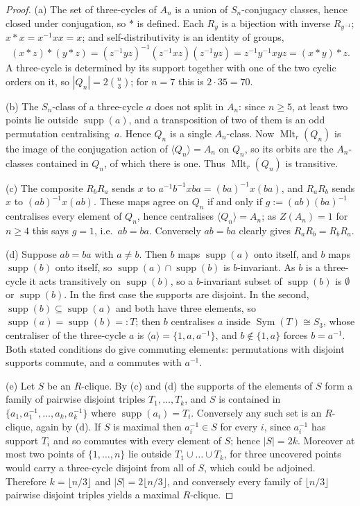 \documentclass[11pt]{amsart}
\theoremstyle{definition}
\theoremstyle{remark}
\DeclareMathOperator{\Mlt}{Mlt}
\DeclareMathOperator{\supp}{supp}
\newcommand{\Rt}{R}
\begin{document}
\begin{proof}
(a) The set of three-cycles of $A_n$ is a union of $S_n$-conjugacy classes,
hence closed under conjugation, so $*$ is defined. Each $\Rt_y$ is a bijection
with inverse $\Rt_{y^{-1}}$; $x*x=x^{-1}xx=x$; and self-distributivity is an
identity of groups,
\[
  (x*z)*(y*z)
  =(z^{-1}yz)^{-1}(z^{-1}xz)(z^{-1}yz)
  =z^{-1}y^{-1}xyz
  =(x*y)*z .
\]
A three-cycle is determined by its support together with one of the two cyclic
orders on it, so $|Q_n|=2\binom n3$; for $n=7$ this is $2\cdot35=70$.

(b) The $S_n$-class of a three-cycle $a$ does not split in $A_n$: since
$n\ge5$, at least two points lie outside $\supp(a)$, and a transposition of two
of them is an odd permutation centralising~$a$. Hence $Q_n$ is a single
$A_n$-class. Now $\Mlt_r(Q_n)$ is the image of the conjugation action of
$\langle Q_n\rangle=A_n$ on $Q_n$, so its orbits are the $A_n$-classes
contained in $Q_n$, of which there is one. Thus $\Mlt_r(Q_n)$ is transitive.

(c) The composite $\Rt_b\Rt_a$ sends $x$ to $a^{-1}b^{-1}xba=(ba)^{-1}x(ba)$,
and $\Rt_a\Rt_b$ sends $x$ to $(ab)^{-1}x(ab)$. These maps agree on $Q_n$ if
and only if $g:=(ab)(ba)^{-1}$ centralises every element of $Q_n$, hence
centralises $\langle Q_n\rangle=A_n$; as $Z(A_n)=1$ for $n\ge4$ this says
$g=1$, i.e.\ $ab=ba$. Conversely $ab=ba$ clearly gives
$\Rt_a\Rt_b=\Rt_b\Rt_a$.

(d) Suppose $ab=ba$ with $a\ne b$. Then $b$ maps $\supp(a)$ onto itself, and
$b$ maps $\supp(b)$ onto itself, so $\supp(a)\cap\supp(b)$ is $b$-invariant.
As $b$ is a three-cycle it acts transitively on $\supp(b)$, so a $b$-invariant
subset of $\supp(b)$ is $\emptyset$ or $\supp(b)$. In the first case the
supports are disjoint. In the second, $\supp(b)\subseteq\supp(a)$ and both have
three elements, so $\supp(a)=\supp(b)=:T$; then $b$ centralises $a$ inside
$\operatorname{Sym}(T)\cong S_3$, whose centraliser of the three-cycle $a$ is
$\langle a\rangle=\{1,a,a^{-1}\}$, and $b\notin\{1,a\}$ forces $b=a^{-1}$.
Both stated conditions do give commuting elements: permutations with disjoint
supports commute, and $a$ commutes with $a^{-1}$.

(e) Let $S$ be an $R$-clique. By (c) and (d) the supports of the elements of
$S$ form a family of pairwise disjoint triples $T_1,\dots,T_k$, and $S$ is
contained in $\{a_1,a_1^{-1},\dots,a_k,a_k^{-1}\}$ where $\supp(a_i)=T_i$.
Conversely any such set is an $R$-clique, again by (d). If $S$ is maximal then
$a_i^{-1}\in S$ for every $i$, since $a_i^{-1}$ has support $T_i$ and so
commutes with every element of $S$; hence $|S|=2k$. Moreover at most two
points of $\{1,\dots,n\}$ lie outside $T_1\cup\dots\cup T_k$, for three
uncovered points would carry a three-cycle disjoint from all of $S$, which
could be adjoined. Therefore $k=\lfloor n/3\rfloor$ and
$|S|=2\lfloor n/3\rfloor$, and conversely every family of
$\lfloor n/3\rfloor$ pairwise disjoint triples yields a maximal $R$-clique.
\end{proof}
\end{document}
